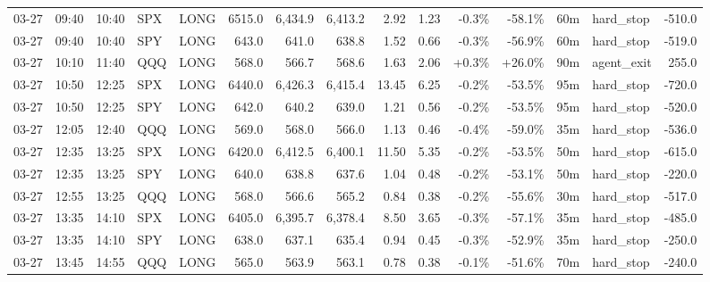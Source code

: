 \documentclass[11pt,a4paper,twoside]{article}
\begin{document}
\begin{landscape}
\begin{center}
\begin{longtable}{>{\color{txtmain}}l l l l l r r r r r r r r >{\color{txtmain}}l r}
03-27 & 09:40 & 10:40 & SPX & LONG & 6515.0 & 6,434.9 & 6,413.2 & 2.92 & 1.23 & \textcolor{lossred}{-0.3\%} & \textcolor{lossred}{-58.1\%} & 60m & hard\_stop & \textcolor{lossred}{-510.0} \\
03-27 & 09:40 & 10:40 & SPY & LONG & 643.0 & 641.0 & 638.8 & 1.52 & 0.66 & \textcolor{lossred}{-0.3\%} & \textcolor{lossred}{-56.9\%} & 60m & hard\_stop & \textcolor{lossred}{-519.0} \\
03-27 & 10:10 & 11:40 & QQQ & LONG & 568.0 & 566.7 & 568.6 & 1.63 & 2.06 & \textcolor{wingreen}{+0.3\%} & \textcolor{wingreen}{+26.0\%} & 90m & agent\_exit & \textcolor{wingreen}{255.0} \\
03-27 & 10:50 & 12:25 & SPX & LONG & 6440.0 & 6,426.3 & 6,415.4 & 13.45 & 6.25 & \textcolor{lossred}{-0.2\%} & \textcolor{lossred}{-53.5\%} & 95m & hard\_stop & \textcolor{lossred}{-720.0} \\
03-27 & 10:50 & 12:25 & SPY & LONG & 642.0 & 640.2 & 639.0 & 1.21 & 0.56 & \textcolor{lossred}{-0.2\%} & \textcolor{lossred}{-53.5\%} & 95m & hard\_stop & \textcolor{lossred}{-520.0} \\
03-27 & 12:05 & 12:40 & QQQ & LONG & 569.0 & 568.0 & 566.0 & 1.13 & 0.46 & \textcolor{lossred}{-0.4\%} & \textcolor{lossred}{-59.0\%} & 35m & hard\_stop & \textcolor{lossred}{-536.0} \\
03-27 & 12:35 & 13:25 & SPX & LONG & 6420.0 & 6,412.5 & 6,400.1 & 11.50 & 5.35 & \textcolor{lossred}{-0.2\%} & \textcolor{lossred}{-53.5\%} & 50m & hard\_stop & \textcolor{lossred}{-615.0} \\
03-27 & 12:35 & 13:25 & SPY & LONG & 640.0 & 638.8 & 637.6 & 1.04 & 0.48 & \textcolor{lossred}{-0.2\%} & \textcolor{lossred}{-53.1\%} & 50m & hard\_stop & \textcolor{lossred}{-220.0} \\
03-27 & 12:55 & 13:25 & QQQ & LONG & 568.0 & 566.6 & 565.2 & 0.84 & 0.38 & \textcolor{lossred}{-0.2\%} & \textcolor{lossred}{-55.6\%} & 30m & hard\_stop & \textcolor{lossred}{-517.0} \\
03-27 & 13:35 & 14:10 & SPX & LONG & 6405.0 & 6,395.7 & 6,378.4 & 8.50 & 3.65 & \textcolor{lossred}{-0.3\%} & \textcolor{lossred}{-57.1\%} & 35m & hard\_stop & \textcolor{lossred}{-485.0} \\
03-27 & 13:35 & 14:10 & SPY & LONG & 638.0 & 637.1 & 635.4 & 0.94 & 0.45 & \textcolor{lossred}{-0.3\%} & \textcolor{lossred}{-52.9\%} & 35m & hard\_stop & \textcolor{lossred}{-250.0} \\
03-27 & 13:45 & 14:55 & QQQ & LONG & 565.0 & 563.9 & 563.1 & 0.78 & 0.38 & \textcolor{lossred}{-0.1\%} & \textcolor{lossred}{-51.6\%} & 70m & hard\_stop & \textcolor{lossred}{-240.0} \\

\end{longtable}
\end{center}
\end{landscape}
\end{document}
